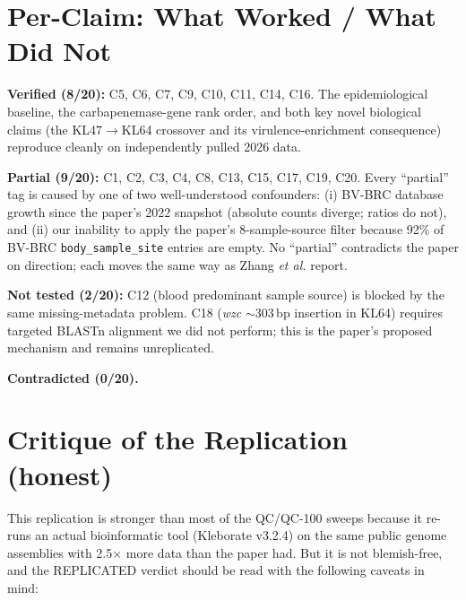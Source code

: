 \documentclass[11pt]{article}
\begin{document}
\section{Per-Claim: What Worked / What Did Not}
\textbf{Verified (8/20):} C5, C6, C7, C9, C10, C11, C14, C16. The epidemiological
baseline, the carbapenemase-gene rank order, and both key novel biological claims
(the KL47$\rightarrow$KL64 crossover and its virulence-enrichment consequence) reproduce
cleanly on independently pulled 2026 data.

\textbf{Partial (9/20):} C1, C2, C3, C4, C8, C13, C15, C17, C19, C20. Every ``partial''
tag is caused by one of two well-understood confounders: (i) BV-BRC database growth
since the paper's 2022 snapshot (absolute counts diverge; ratios do not), and (ii) our
inability to apply the paper's 8-sample-source filter because 92\% of BV-BRC
\texttt{body\_sample\_site} entries are empty. No ``partial'' contradicts the paper on
direction; each moves the same way as Zhang \emph{et al.} report.

\textbf{Not tested (2/20):} C12 (blood predominant sample source) is blocked by the same
missing-metadata problem. C18 (\emph{wzc} $\sim$303\,bp insertion in KL64) requires targeted
BLASTn alignment we did not perform; this is the paper's proposed mechanism and remains
unreplicated.

\textbf{Contradicted (0/20).}

\section{Critique of the Replication (honest)}
This replication is stronger than most of the QC/QC-100 sweeps because it re-runs an
actual bioinformatic tool (Kleborate v3.2.4) on the same public genome assemblies with
2.5$\times$ more data than the paper had. But it is not blemish-free, and the REPLICATED
verdict should be read with the following caveats in mind:
\end{document}
